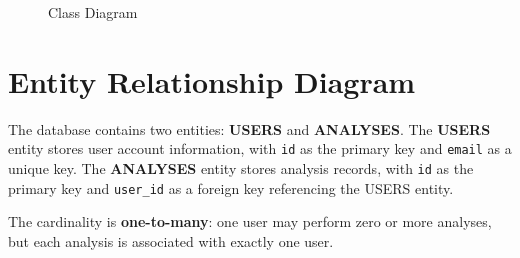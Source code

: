 \documentclass[12pt, a4paper]{report}
\begin{document}
\begin{figure}[H]
    \caption{Class Diagram}
    \label{fig:class-diag}
\end{figure}

\section{Entity Relationship Diagram}

The database contains two entities: \textbf{USERS} and \textbf{ANALYSES}. The \textbf{USERS} entity stores user account information, with \texttt{id} as the primary key and \texttt{email} as a unique key. The \textbf{ANALYSES} entity stores analysis records, with \texttt{id} as the primary key and \texttt{user\_id} as a foreign key referencing the USERS entity.

The cardinality is \textbf{one-to-many}: one user may perform zero or more analyses, but each analysis is associated with exactly one user.
\end{document}
